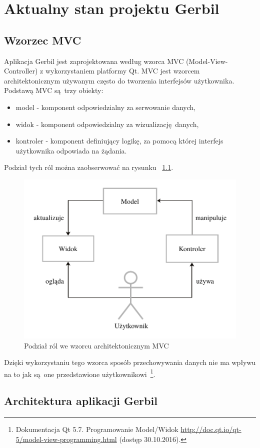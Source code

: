 \chapter{Aktualny stan projektu Gerbil}

 \section{Wzorzec MVC}

Aplikacja Gerbil jest zaprojektowana według wzorca MVC (Model-View-Controller) z wykorzystaniem platformy Qt. MVC jest wzorcem architektonicznym używanym często do tworzenia interfejsów użytkownika. Podstawą MVC są trzy obiekty:
\begin{itemize}
	\item model - komponent odpowiedzialny za serwowanie danych,
	\item widok - komponent odpowiedzialny za wizualizację danych,
	\item kontroler - komponent definiujący logikę, za pomocą której interfejs użytkownika odpowiada na żądania.
\end{itemize}
Podział tych ról można zaobserwować na rysunku ~\ref{fig:mvc}.

\begin{figure}[ht]
	\centering
	\includegraphics[width=0.7\linewidth]{rys04/mvc}
	\caption{Podział ról we wzorcu architektonicznym MVC}
	\label{fig:mvc}	
\end{figure}

Dzięki wykorzystaniu tego wzorca sposób przechowywania danych nie ma wpływu na to jak są one przedstawione użytkownikowi~\footnote{Dokumentacja Qt 5.7. Programowanie Model/Widok \url{http://doc.qt.io/qt-5/model-view-programming.html} (dostęp 30.10.2016).}.

\section {Architektura aplikacji Gerbil}

